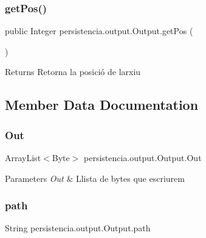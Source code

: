 \subsubsection{\texorpdfstring{get\+Pos()}{getPos()}}
{\footnotesize\ttfamily public Integer persistencia.\+output.\+Output.\+get\+Pos (\begin{DoxyParamCaption}{ }\end{DoxyParamCaption})\hspace{0.3cm}{\ttfamily [inline]}}

\begin{DoxyReturn}{Returns}
Retorna la posició de l\textquotesingle{}arxiu 
\end{DoxyReturn}


\subsection{Member Data Documentation}
\mbox{\label{classpersistencia_1_1output_1_1Output_ab993115d43930b7fb69e5d1c99addfba}} 
\subsubsection{\texorpdfstring{Out}{Out}}
{\footnotesize\ttfamily Array\+List$<$Byte$>$ persistencia.\+output.\+Output.\+Out\hspace{0.3cm}{\ttfamily [package]}}


\begin{DoxyParams}{Parameters}
{\em Out} & Llista de bytes que escriurem \\
\hline
\end{DoxyParams}
\mbox{\label{classpersistencia_1_1output_1_1Output_aebef717882f3bcc7080dec014c6714c9}} 
\subsubsection{\texorpdfstring{path}{path}}
{\footnotesize\ttfamily String persistencia.\+output.\+Output.\+path\hspace{0.3cm}{\ttfamily [package]}}


